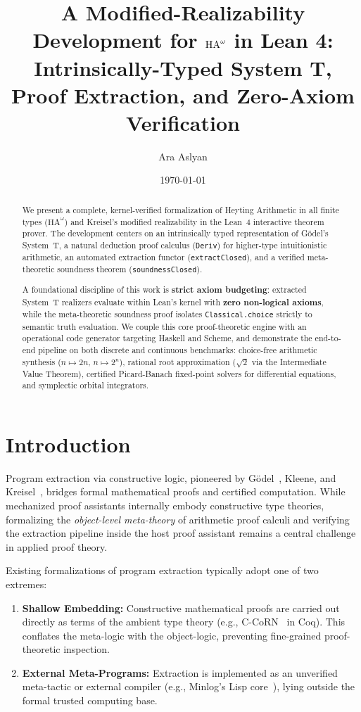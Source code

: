 \documentclass[11pt,a4paper]{article}
\title{\textbf{A Modified-Realizability Development for $\HAomega$ in Lean 4:\\Intrinsically-Typed System T, Proof Extraction, and Zero-Axiom Verification}}
\author{Ara Aslyan}
\date{\today}
\theoremstyle{definition}
\theoremstyle{remark}
\newcommand{\HAomega}{\ensuremath{\mathrm{HA}^\omega}}
\begin{document}
\maketitle

\begin{abstract}
We present a complete, kernel-verified formalization of Heyting Arithmetic in all finite types ($\HAomega$) and Kreisel's modified realizability in the Lean~4 interactive theorem prover. The development centers on an intrinsically typed representation of G\"odel's System~T, a natural deduction proof calculus (\texttt{Deriv}) for higher-type intuitionistic arithmetic, an automated extraction functor (\texttt{extractClosed}), and a verified meta-theoretic soundness theorem (\texttt{soundnessClosed}).

A foundational discipline of this work is \textbf{strict axiom budgeting}: extracted System~T realizers evaluate within Lean's kernel with \textbf{zero non-logical axioms}, while the meta-theoretic soundness proof isolates \texttt{Classical.choice} strictly to semantic truth evaluation. We couple this core proof-theoretic engine with an operational code generator targeting Haskell and Scheme, and demonstrate the end-to-end pipeline on both discrete and continuous benchmarks: choice-free arithmetic synthesis ($n \mapsto 2n$, $n \mapsto 2^n$), rational root approximation ($\sqrt{2}$ via the Intermediate Value Theorem), certified Picard-Banach fixed-point solvers for differential equations, and symplectic orbital integrators.
\end{abstract}

\section{Introduction}

Program extraction via constructive logic, pioneered by G\"odel~\cite{godel1958}, Kleene, and Kreisel~\cite{kreisel1959}, bridges formal mathematical proofs and certified computation. While mechanized proof assistants internally embody constructive type theories, formalizing the \emph{object-level meta-theory} of arithmetic proof calculi and verifying the extraction pipeline inside the host proof assistant remains a central challenge in applied proof theory.

Existing formalizations of program extraction typically adopt one of two extremes:
\begin{enumerate}
    \item \textbf{Shallow Embedding:} Constructive mathematical proofs are carried out directly as terms of the ambient type theory (e.g., C-CoRN~\cite{cruzfilipe2004} in Coq). This conflates the meta-logic with the object-logic, preventing fine-grained proof-theoretic inspection.
    \item \textbf{External Meta-Programs:} Extraction is implemented as an unverified meta-tactic or external compiler (e.g., Minlog's Lisp core~\cite{schwichtenberg2012}), lying outside the formal trusted computing base.
\end{enumerate}
\end{document}
